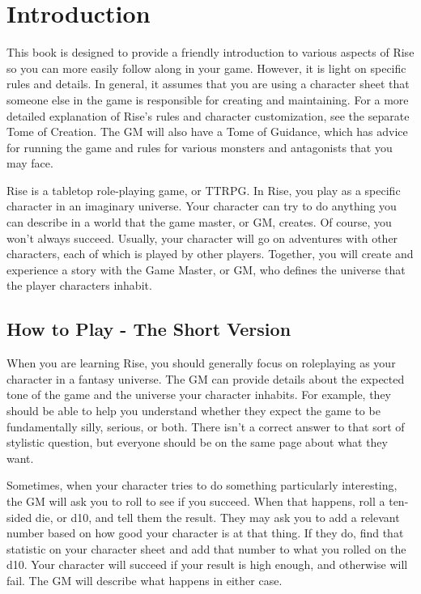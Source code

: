 \chapter{Introduction}

This book is designed to provide a friendly introduction to various aspects of Rise so you can more easily follow along in your game.
However, it is light on specific rules and details.
In general, it assumes that you are using a character sheet that someone else in the game is responsible for creating and maintaining.
For a more detailed explanation of Rise's rules and character customization, see the separate Tome of Creation.
The GM will also have a Tome of Guidance, which has advice for running the game and rules for various monsters and antagonists that you may face.

  Rise is a tabletop role-playing game, or TTRPG.
  In Rise, you play as a specific character in an imaginary universe.
  Your character can try to do anything you can describe in a world that the game master, or GM, creates.
  Of course, you won't always succeed.
  Usually, your character will go on adventures with other characters, each of which is played by other players.
  Together, you will create and experience a story with the Game Master, or GM, who defines the universe that the player characters inhabit.

\section{How to Play - The Short Version}
  When you are learning Rise, you should generally focus on roleplaying as your character in a fantasy universe.
  The GM can provide details about the expected tone of the game and the universe your character inhabits.
  For example, they should be able to help you understand whether they expect the game to be fundamentally silly, serious, or both.
  There isn't a correct answer to that sort of stylistic question, but everyone should be on the same page about what they want.

  Sometimes, when your character tries to do something particularly interesting, the GM will ask you to roll to see if you succeed.
  When that happens, roll a ten-sided die, or d10, and tell them the result.
  They may ask you to add a relevant number based on how good your character is at that thing.
  If they do, find that statistic on your character sheet and add that number to what you rolled on the d10.
  Your character will succeed if your result is high enough, and otherwise will fail.
  The GM will describe what happens in either case.

